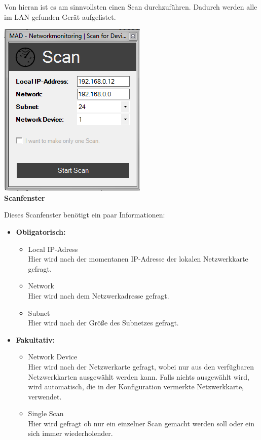 \documentclass[12pt,a4paper]{report}
\begin{document}
\begin{onehalfspace}
Von hieran ist es am sinnvollsten einen Scan durchzuführen. Dadurch werden alle im LAN gefunden Gerät aufgelistet.
\begin{center}
\includegraphics[scale=0.7]{../docs/lyaton/graphics/GUI_v3_scan.png}\\
\textbf{Scanfenster}
\end{center}
Dieses Scanfenster benötigt ein paar Informationen:
\begin{itemize}
\item \textbf{Obligatorisch:}
\begin{itemize}
\item Local IP-Adress\\
Hier wird nach der momentanen IP-Adresse der lokalen Netzwerkkarte gefragt.
\item Network\\
Hier wird nach dem Netzwerkadresse gefragt.
\item Subnet\\
Hier wird nach der Größe des Subnetzes gefragt.
\end{itemize}
\item \textbf{Fakultativ:}
\begin{itemize}
\item Network Device\\
Hier wird nach der Netzwerkarte gefragt, wobei nur aus den verfügbaren Netzwerkkarten ausgewählt werden kann. Falls nichts ausgewählt wird, wird automatisch, die in der Konfiguration vermerkte Netzwerkkarte, verwendet.
\item Single Scan\\
Hier wird gefragt ob nur ein einzelner Scan gemacht werden soll oder ein sich immer wiederholender.
\end{itemize}

\end{itemize}
\end{onehalfspace}
\end{document}
